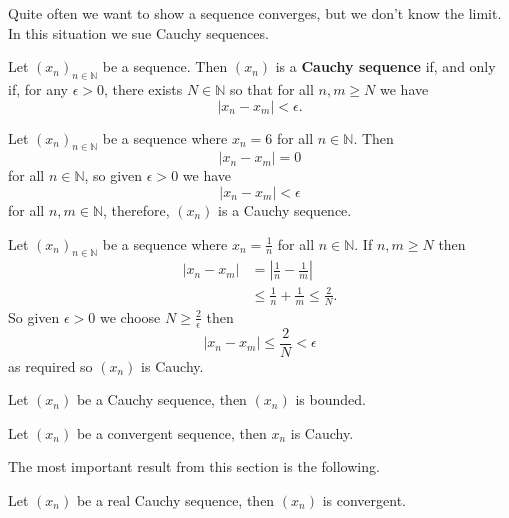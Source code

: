 Quite often we want to show a sequence converges, but we don't know the limit. In this situation we sue Cauchy sequences.

\begin{definition}
    Let $(x_n)_{n\in\mathbb N}$ be a sequence. Then $(x_n)$ is a \textbf{Cauchy sequence} if, and only if, for any $\epsilon>0$, there exists $N\in\mathbb N$ so that for all $n,m\geq N$ we have \[|x_n-x_m|<\epsilon.\]
\end{definition}

\begin{example}
    Let $(x_n)_{n\in\mathbb N}$ be a sequence where $x_n=6$ for all $n\in\mathbb N$. Then \[|x_n-x_m|=0\] for all $n\in\mathbb N$, so given $\epsilon>0$ we have \[|x_n-x_m|<\epsilon\] for all $n,m\in\mathbb N$, therefore, $(x_n)$ is a Cauchy sequence. 
\end{example}

\begin{example}
    Let $(x_n)_{n\in\mathbb N}$ be a sequence where $x_n=\frac1n$ for all $n\in\mathbb N$. If $n,m\geq N$ then 
    \begin{align*}
        |x_n-x_m|&=\left|\frac1n-\frac1m\right|\\
        &\leq\frac1n+\frac1m\leq\frac2N.
    \end{align*}
    So given $\epsilon>0$ we choose $N\geq\frac2\epsilon$ then \[|x_n-x_m|\leq\frac2N<\epsilon\] as required so $(x_n)$ is Cauchy.
\end{example}

\begin{theorem}
    Let $(x_n)$ be a Cauchy sequence, then $(x_n)$ is bounded.
\end{theorem}

\begin{theorem}
    Let $(x_n)$ be a convergent sequence, then $x_n$ is Cauchy.
\end{theorem}

The most important result from this section is the following.

\begin{theorem}
    Let $(x_n)$ be a real Cauchy sequence, then $(x_n)$ is convergent.
\end{theorem}

